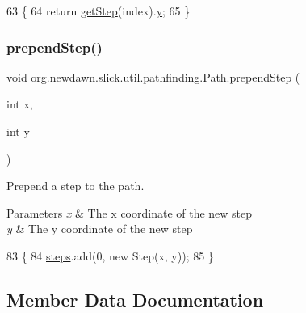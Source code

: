 \begin{DoxyCode}
63                                \{
64         \textcolor{keywordflow}{return} \mbox{\hyperlink{classorg_1_1newdawn_1_1slick_1_1util_1_1pathfinding_1_1_path_acc362a056f4565a8eec1361266eac671}{getStep}}(index).\mbox{\hyperlink{classorg_1_1newdawn_1_1slick_1_1util_1_1pathfinding_1_1_path_1_1_step_ae77364516b69d2b5ed5ed550413c05e9}{y}};
65     \}
\end{DoxyCode}
\mbox{\label{classorg_1_1newdawn_1_1slick_1_1util_1_1pathfinding_1_1_path_ae8736f56aa7a12a793c8ac8c51a77f70}} 
\subsubsection{\texorpdfstring{prepend\+Step()}{prependStep()}}
{\footnotesize\ttfamily void org.\+newdawn.\+slick.\+util.\+pathfinding.\+Path.\+prepend\+Step (\begin{DoxyParamCaption}\item[{int}]{x,  }\item[{int}]{y }\end{DoxyParamCaption})\hspace{0.3cm}{\ttfamily [inline]}}

Prepend a step to the path. ~\newline
 
\begin{DoxyParams}{Parameters}
{\em x} & The x coordinate of the new step \\
\hline
{\em y} & The y coordinate of the new step \\
\hline
\end{DoxyParams}

\begin{DoxyCode}
83                                           \{
84         \mbox{\hyperlink{classorg_1_1newdawn_1_1slick_1_1util_1_1pathfinding_1_1_path_ac2472e1febece895b3e77854043fb4ad}{steps}}.add(0, \textcolor{keyword}{new} Step(x, y));
85     \}
\end{DoxyCode}


\subsection{Member Data Documentation}
\mbox{\label{classorg_1_1newdawn_1_1slick_1_1util_1_1pathfinding_1_1_path_a11534240eff7a163acf2c36a563af4e8}} 
